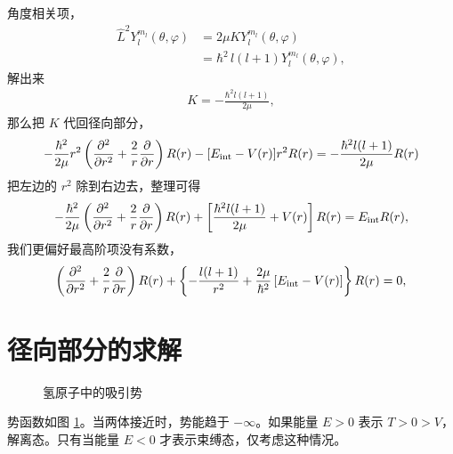 角度相关项，
\begin{align}
    \hat L^2 Y_l^{m_l} (\theta,\varphi) &= 2 \mu K Y_l^{m_l} (\theta,\varphi) \\
    &= \hbar^2 \,l(l+1) Y_l^{m_l} (\theta,\varphi),
\end{align}
解出来
\begin{align}
    K = - \frac{\hbar^2 l(l+1)}{2\mu},
\end{align}
那么把 $K$ 代回径向部分，
\begin{align}
    -\frac{\hbar^2}{2\mu} r^2 \left(\pdv[2]r + \frac2r \pdv{r}\right) R(r) - [ E_{\mathrm{int}} - V(r)] r^2 R(r) = 
    - \frac{\hbar^2 l(l+1)}{2\mu} R(r)
\end{align}
把左边的 $r^2$ 除到右边去，整理可得
\begin{align}
    -\frac{\hbar^2}{2\mu} \left(\pdv[2]r + \frac2r \pdv{r}\right) R(r)
    + \left[
        \frac{\hbar^2 l(l+1)}{2\mu} + V(r)
    \right] R(r)
    = 
    E_{\mathrm{int}} R(r),
\end{align}
我们更偏好最高阶项没有系数，
\begin{align}
    \left(\pdv[2]r + \frac2r \pdv{r}\right) R(r) 
    + \left\{
        - \frac{l(l+1)}{r^2} + \frac{2\mu}{\hbar^2} 
        \left[
            E_{\mathrm{int}} - V(r)
        \right] 
    \right\} R(r) = 0,
\end{align}

\section{径向部分的求解}
\begin{figure}[tp]\centering
    \caption{氢原子中的吸引势}
    \label{fig:H_attraction}
    \end{figure}
势函数如图 \ref{fig:H_attraction}。当两体接近时，势能趋于 $-\infty$。如果能量 $E>0$ 表示 $T>0>V$，解离态。只有当能量 $E<0$ 才表示束缚态，仅考虑这种情况。

